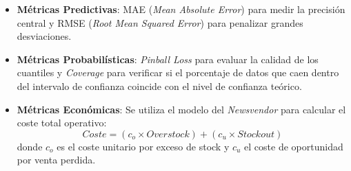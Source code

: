 \begin{itemize}
    \item \textbf{Métricas Predictivas}: MAE (\textit{Mean Absolute Error}) para medir la precisión central y RMSE (\textit{Root Mean Squared Error}) para penalizar grandes desviaciones.
    \item \textbf{Métricas Probabilísticas}: \textit{Pinball Loss} para evaluar la calidad de los cuantiles y \textit{Coverage} para verificar si el porcentaje de datos que caen dentro del intervalo de confianza coincide con el nivel de confianza teórico.
    \item \textbf{Métricas Económicas}: Se utiliza el modelo del \textit{Newsvendor} para calcular el coste total operativo:
    \begin{equation}
        Coste = (c_o \times Overstock) + (c_u \times Stockout)
    \end{equation}
    donde $c_o$ es el coste unitario por exceso de stock y $c_u$ el coste de oportunidad por venta perdida.
\end{itemize}
